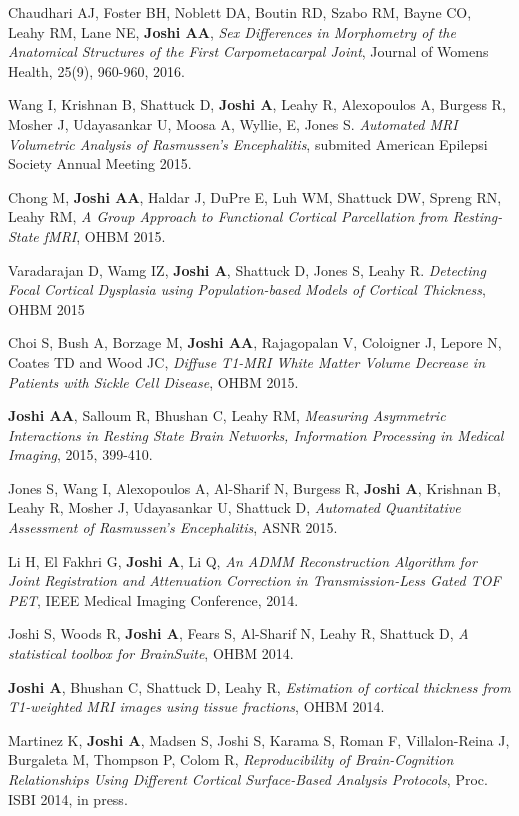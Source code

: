 \documentclass[overlapped,line,letterpaper]{res}
\begin{document}
\begin{resume}
Chaudhari AJ, Foster BH, Noblett DA, Boutin RD, Szabo RM, Bayne CO, Leahy RM, Lane NE, \textbf{Joshi AA}, \textit{Sex Differences in Morphometry of the Anatomical Structures of the First Carpometacarpal Joint}, Journal of Womens Health, 25(9), 960-960, 2016.

Wang I, Krishnan B, Shattuck D, \textbf{Joshi A}, Leahy R, Alexopoulos A, Burgess R, Mosher J, Udayasankar U, Moosa A, Wyllie, E, Jones S. \textit{Automated MRI Volumetric Analysis of Rasmussen's Encephalitis}, submited American Epilepsi Society Annual Meeting 2015.

Chong M, \textbf{Joshi AA}, Haldar J, DuPre E, Luh WM, Shattuck DW, Spreng RN, Leahy RM, \textit{A Group Approach to Functional Cortical Parcellation from Resting-State fMRI}, OHBM 2015.

Varadarajan D, Wamg IZ, \textbf{Joshi A}, Shattuck D, Jones S, Leahy R. \textit{Detecting Focal Cortical Dysplasia using Population-based Models of Cortical Thickness},  OHBM 2015

Choi S, Bush A, Borzage M, \textbf{Joshi AA}, Rajagopalan V, Coloigner J, Lepore N, Coates TD and Wood JC, \textit{Diffuse T1-MRI White Matter Volume Decrease in Patients with Sickle Cell Disease}, OHBM 2015.


\textbf{Joshi AA}, Salloum R, Bhushan C, Leahy RM, \textit{Measuring Asymmetric Interactions in Resting State Brain Networks, Information Processing in Medical Imaging}, 2015, 399-410.

Jones S, Wang I, Alexopoulos A, Al-Sharif N, Burgess R, \textbf{Joshi A}, Krishnan B, Leahy R, Mosher J, Udayasankar U, Shattuck D, \textit{Automated Quantitative Assessment of Rasmussen's Encephalitis}, ASNR 2015.

Li H, El Fakhri G, \textbf{Joshi A}, Li Q, \textit{An ADMM Reconstruction Algorithm for Joint Registration and Attenuation Correction in Transmission-Less Gated TOF PET}, IEEE Medical Imaging Conference, 2014.


Joshi S, Woods R, \textbf{Joshi A}, Fears S, Al-Sharif N, Leahy R, Shattuck D, \textit{A statistical toolbox for BrainSuite}, OHBM 2014.

\textbf{Joshi A}, Bhushan C, Shattuck D, Leahy R, \textit{Estimation of cortical thickness from T1-weighted MRI images using tissue fractions}, OHBM 2014.

Martinez K, \textbf{Joshi A}, Madsen S, Joshi S, Karama S, Roman F, Villalon-Reina J, Burgaleta M, Thompson P, Colom R, \textit{Reproducibility of Brain-Cognition Relationships Using Different Cortical Surface-Based Analysis Protocols}, Proc. ISBI 2014, in press.


\end{resume}
\end{document}
